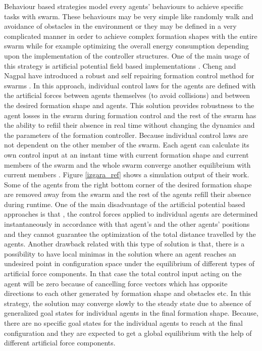 Behaviour based strategies model every agents' behaviours to achieve specific tasks with swarm. These behaviours may be very simple like randomly walk and avoidance of  obstacles in the environment or they may be defined in a very complicated manner in order to achieve complex formation shapes with the entire swarm while for example optimizing the overall energy consumption depending  upon the implementation of the controller structures.  One of the main usage of this strategy is artificial potential field based implementations . Cheng and Nagpal have introduced a robust and self repairing formation control method for swarms \cite{24}. In this approach, individual control laws for the agents are defined with the artificial forces between agents themselves (to avoid collisions) and between the desired formation shape and agents. This solution provides robustness to the agent losses in the swarm during formation control and the rest of the swarm has the ability to refiil their absence in real time without changing the dynamics and the parameters of the formation controller. Because individual control laws are not dependent on the other member of the swarm. Each agent can calculate its own control input at an instant time with current formation shape and current members of the swarm and the whole swarm converge another equilibrium with current members \cite{24}. Figure \ref{izgara_ref} shows a simulation output of their work. Some of the agents from the right bottom corner of the desired formation shape are removed away from the swarm and the rest of the agents refill their absence during runtime. One of the main disadvantage of the artificial potential based approaches is that , the control forces applied to individual agents are determined instantaneously in accordance with that agent's and the other agents' positions and they cannot guarantee the optimization of the total distance travelled by the agents. Another drawback related with this type of solution is that, there is a possibility to have local minimas in the solution where an agent reaches an undesired point in configuration space under the equilibrium of different types of artificial force components. In that case the total control input acting on the agent will be zero because of cancelling force vectors which has opposite directions to each other generated by formation shape and obstacles etc. In this strategy, the solution may converge slowly to the steady state due to absence of generalized goal states for individual agents in the final formation shape. Because, there are no specific goal states for the individual agents to reach at the final configuration and they are expected to get a global equilibrium with the help of different artificial force components. 

